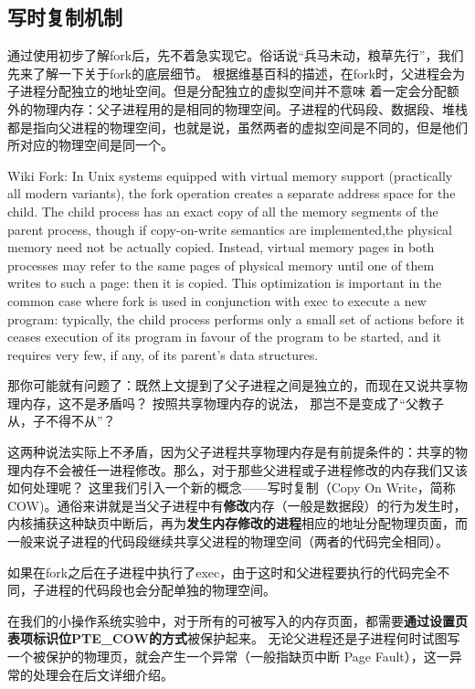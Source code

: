 \subsection{写时复制机制}

通过使用初步了解fork后，先不着急实现它。俗话说“兵马未动，粮草先行”，我们先来了解一下关于fork的底层细节。
根据维基百科的描述，在fork时，父进程会为子进程分配独立的地址空间。但是分配独立的虚拟空间并不意味
着一定会分配额外的物理内存：父子进程用的是相同的物理空间。子进程的代码段、数据段、堆栈
都是指向父进程的物理空间，也就是说，虽然两者的虚拟空间是不同的，但是他们所对应的物理空间是同一个。

\begin{note}
\small{
Wiki Fork: In Unix systems equipped with virtual memory support (practically all modern variants), the fork operation creates a separate address space
 for the child. The child process has an exact copy of all the memory segments of the parent process, though if copy-on-write semantics
 are implemented,the physical memory need not be actually copied. Instead, virtual memory pages in both processes may refer to the same pages of physical memory
 until one of them writes to such a page: then it is copied. This optimization is important in the common case where fork is used
 in conjunction with exec to execute a new program: typically, the child process performs only a small set of actions before it ceases
 execution of its program in favour of the program to be started, and it requires very few, if any, of its parent's data structures.}
\end{note}

那你可能就有问题了：既然上文提到了父子进程之间是独立的，而现在又说共享物理内存，这不是矛盾吗？
按照共享物理内存的说法， 那岂不是变成了“父教子从，子不得不从”？

这两种说法实际上不矛盾，因为父子进程共享物理内存是有前提条件的：共享的物理内存不会被任一进程修改。那么，对于那些父进程或子进程修改的内存我们又该如何处理呢？
这里我们引入一个新的概念——写时复制（Copy On Write，简称COW)。通俗来讲就是当父子进程中有\textbf{修改}内存（一般是数据段）的行为发生时，内核捕获这种缺页中断后，再为\textbf{发生内存修改的进程}相应的地址分配物理页面，而一般来说子进程的代码段继续共享父进程的物理空间（两者的代码完全相同）。

\begin{note}
如果在fork之后在子进程中执行了exec，由于这时和父进程要执行的代码完全不同，子进程的代码段也会分配单独的物理空间。
\end{note}

在我们的小操作系统实验中，对于所有的可被写入的内存页面，都需要\textbf{通过设置页表项标识位PTE\_COW的方式}被保护起来。
无论父进程还是子进程何时试图写一个被保护的物理页，就会产生一个异常（一般指缺页中断 Page Fault），这一异常的处理会在后文详细介绍。

